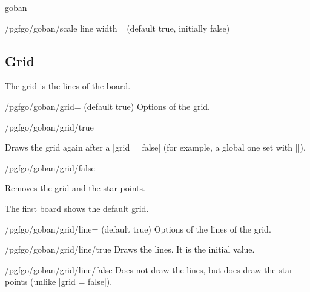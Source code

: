 \begin{environment}{{goban}}
\begin{key}{/pgfgo/goban/scale line width= (default true, initially false)}
\begin{codeexample}[width=5.5cm]
			\begin{goban}[2, scale = 2, scale line width]
			\end{goban}
		\end{codeexample}
	\end{key}

	\subsection{Grid}

	The grid is the lines of the board.

	\begin{key}{/pgfgo/goban/grid= (default true)}
		Options of the grid.
	\end{key}

	\begin{stylekey}{/pgfgo/goban/grid/true}

		Draws the grid again after a |grid = false| (for example, a global one set with |\pgfgoset|).
	\end{stylekey}

	\begin{stylekey}{/pgfgo/goban/grid/false}

		Removes the grid and the star points.

		\begin{codeexample}[]
			\begin{goban}[3]
			\end{goban}

			\begin{goban}[3, grid = false]
			\end{goban}
		\end{codeexample}

		The first board shows the default grid.
	\end{stylekey}

	\begin{key}{/pgfgo/goban/grid/line= (default true)}
		Options of the lines of the grid.
	\end{key}

	\begin{stylekey}{/pgfgo/goban/grid/line/true}
		Draws the lines. It is the initial value.
	\end{stylekey}

	\begin{stylekey}{/pgfgo/goban/grid/line/false}
		Does not draw the lines, but does draw the star points (unlike |grid = false|).


\end{stylekey}
\end{environment}
